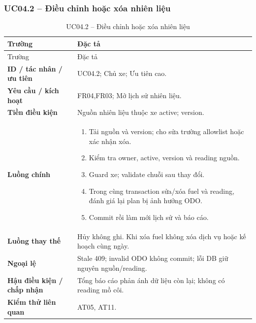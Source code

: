 \subsubsection{UC04.2 -- Điều chỉnh hoặc xóa nhiên liệu}\label{uc:UC04.2}
\begin{smalltable}\begin{longtable}{L{3.2cm}L{11.8cm}}
\caption{UC04.2 -- Điều chỉnh hoặc xóa nhiên liệu}\label{tab:UC04.2}\\
\toprule Trường & Đặc tả\\\midrule\endfirsthead
\toprule Trường & Đặc tả\\\midrule\endhead
\textbf{ID / tác nhân / ưu tiên} & UC04.2; Chủ xe; Ưu tiên cao.\\
\textbf{Yêu cầu / kích hoạt} & FR04,FR03; Mở lịch sử nhiên liệu.\\
\textbf{Tiền điều kiện} & Nguồn nhiên liệu thuộc xe active; version.\\
\textbf{Luồng chính} & \begin{enumerate}[leftmargin=*,nosep]
\item Tải nguồn và version; cho sửa trường allowlist hoặc xác nhận xóa.
\item Kiểm tra owner, active, version và reading nguồn.
\item Guard xe; validate chuỗi sau thay đổi.
\item Trong cùng transaction sửa/xóa fuel và reading, đánh giá lại plan bị ảnh hưởng ODO.
\item Commit rồi làm mới lịch sử và báo cáo.
\end{enumerate}\\
\textbf{Luồng thay thế} & Hủy không ghi. Khi xóa fuel không xóa dịch vụ hoặc kế hoạch cùng ngày.\\
\textbf{Ngoại lệ} & Stale 409; invalid ODO không commit; lỗi DB giữ nguyên nguồn/reading.\\
\textbf{Hậu điều kiện / chấp nhận} & Tổng báo cáo phản ánh dữ liệu còn lại; không có reading mồ côi.\\
\textbf{Kiểm thử liên quan} & AT05, AT11.\\
\bottomrule\end{longtable}\end{smalltable}
